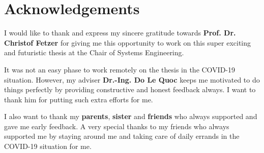 

\section*{}\thispagestyle{empty}
\section*{Acknowledgements}
I would like to thank and express my sincere gratitude towards \textbf{Prof. Dr. Christof Fetzer} for giving me this opportunity to work on this super exciting and futuristic thesis at the Chair of Systems Engineering.

It was not an easy phase to work remotely on the thesis in the COVID-19 situation. However, my adviser \textbf{Dr.-Ing. Do Le Quoc} keeps me motivated to do things perfectly by providing constructive and honest feedback always. I want to thank him for putting such extra efforts for me.

I also want to thank my \textbf{parents}, \textbf{sister} and \textbf{friends} who always supported and gave me early feedback. A very special thanks to my friends who always supported me by staying around me and taking care of daily errands in the COVID-19 situation for me.


